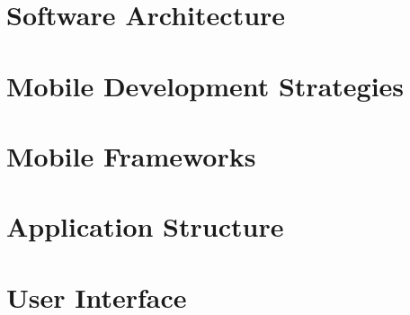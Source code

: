 
\section{Software Architecture}


\section{Mobile Development Strategies}


\section{Mobile Frameworks}


\section{Application Structure}


\section{User Interface}


